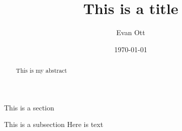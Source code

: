 \documentclass{article}
\title{This is a title}
\author{Evan Ott}
\date{\today}
\begin{document}
\maketitle
\begin{abstract}
	This is my abstract
\end{abstract}
\begin{section}{This is a section}
	\begin{subsection}{This is a subsection}
		Here is text
	\end{subsection}
\end{section}
\end{document}
